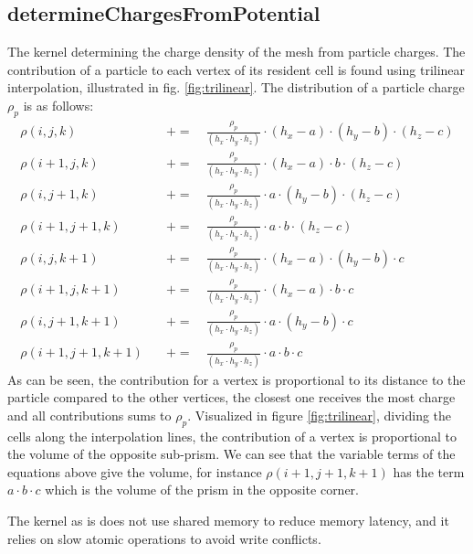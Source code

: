 \subsection{determineChargesFromPotential}
The kernel determining the charge density of the mesh from particle charges. The contribution of a particle to each
vertex of its resident cell is found using trilinear interpolation, illustrated in fig. \ref{fig:trilinear}. The
distribution of a particle charge $\rho_p$ is as follows:
\begin{align*}
                \rho(i, j, k) \quad &+=\quad \frac{\rho_p }{ (h_x \cdot h_y \cdot h_z)} \cdot (h_x-a) \cdot (h_y-b) \cdot (h_z-c)\\
            \rho(i+1, j, k) \quad &+=\quad \frac {\rho_p }{ (h_x \cdot h_y \cdot h_z)} \cdot (h_x-a) \cdot b \cdot (h_z-c)         \\
            \rho(i, j+1, k) \quad &+=\quad \frac {\rho_p }{ (h_x \cdot h_y \cdot h_z)} \cdot a \cdot (h_y-b) \cdot (h_z-c)         \\
       \rho(i+1, j+1, k) \quad &+=\quad \frac{\rho_p }{ (h_x \cdot h_y \cdot h_z)} \cdot a \cdot b \cdot (h_z-c)                   \\
           \rho(i, j, k+1) \quad &+=\quad \frac{\rho_p }{ (h_x \cdot h_y \cdot h_z)} \cdot (h_x-a) \cdot (h_y-b) \cdot c         \\
      \rho(i+1, j, k+1) \quad &+= \quad \frac{\rho_p }{ (h_x \cdot h_y \cdot h_z)} \cdot (h_x-a) \cdot b \cdot c                   \\
      \rho(i, j+1, k+1) \quad &+= \quad \frac{\rho_p }{ (h_x \cdot h_y \cdot h_z)} \cdot a \cdot (h_y-b) \cdot c                   \\
 \rho(i+1, j+1, k+1) \quad &+= \quad \frac{\rho_p }{ (h_x \cdot h_y \cdot h_z)} \cdot a \cdot b \cdot c
\end{align*}
As can be seen, the contribution for a vertex is proportional to its distance to the particle compared to the other
vertices, the closest one receives the most charge and all contributions sums to $\rho_p$. Visualized in figure \ref{fig:trilinear},
dividing the cells along the interpolation lines, the contribution of a vertex is proportional to the volume of the
opposite sub-prism. We can see that the variable terms of the equations above give the volume, for instance
$\rho(i+1, j+1, k+1)$ has the term $a\cdot b\cdot c$ which is the volume of the prism in the opposite corner.

The kernel as is does not use shared memory to reduce memory latency, and it relies on slow atomic operations to avoid
write conflicts.

